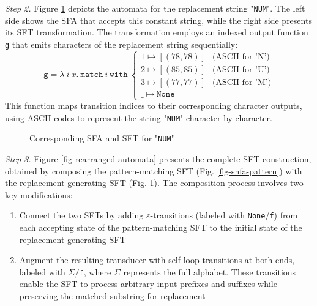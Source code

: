 \documentclass[a4paper,UKenglish,cleveref, autoref, anonymous, thm-restate]{lipics-v2021}
\begin{document}
\noindent\emph{Step 2.}
Figure \ref{fig-snfa-replacement} depicts the automata for the replacement string "\texttt{NUM}". The left side shows the SFA that accepts this constant string, while the right side presents its SFT transformation. The transformation employs an indexed output function \texttt{g} that emits characters of the replacement string sequentially:
\[
\texttt{g} = \lambda~i~x.~\texttt{match}~i~\texttt{with}~
\begin{cases}
1 \mapsto [(78, 78)] & \text{(ASCII for 'N')} \\
2 \mapsto [(85, 85)] & \text{(ASCII for 'U')} \\
3 \mapsto [(77, 77)] & \text{(ASCII for 'M')} \\
\_ \mapsto \texttt{None}
\end{cases}
\]
This function maps transition indices to their corresponding character outputs, using ASCII codes to represent the string "\texttt{NUM}" character by character.


\begin{figure}[h] \centering
{}
\caption{Corresponding SFA and SFT for "\texttt{NUM}"}
\label{fig-snfa-replacement}
\end{figure}


\noindent\emph{Step 3.}
Figure \ref{fig-rearranged-automata} presents the complete SFT construction, obtained by composing the pattern-matching SFT (Fig. \ref{fig-snfa-pattern}) with the replacement-generating SFT (Fig. \ref{fig-snfa-replacement}). The composition process involves two key modifications:
\begin{enumerate}
  \item Connect the two SFTs by adding $\varepsilon$-transitions (labeled with \texttt{None}/\texttt{f}) from each accepting state of the pattern-matching SFT to the initial state of the replacement-generating SFT
  \item Augment the resulting transducer with self-loop transitions at both ends, labeled with $\Sigma/\texttt{f}$, where $\Sigma$ represents the full alphabet. These transitions enable the SFT to process arbitrary input prefixes and suffixes while preserving the matched substring for replacement
\end{enumerate}
\end{document}
